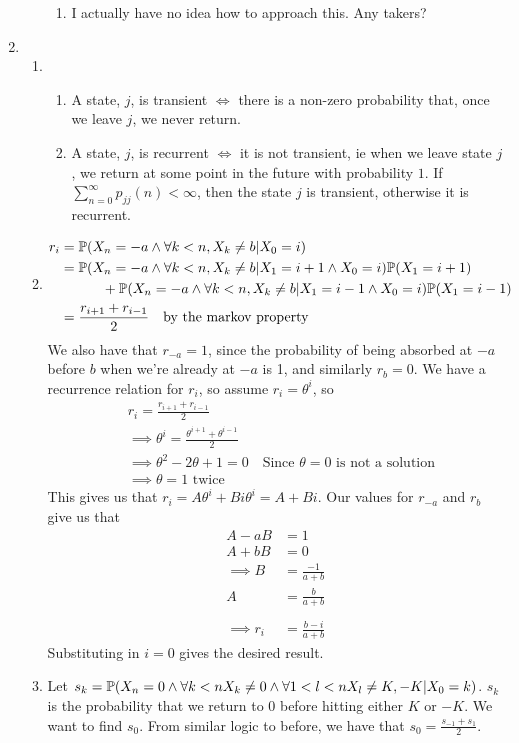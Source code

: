 \documentclass{article}
\begin{document}
\begin{enumerate}
\begin{enumerate}
\begin{enumerate}
\item
I actually have no idea how to approach this. Any takers?
\end{enumerate}
\end{enumerate}
\clearpage
\item 
\begin{enumerate}
\item
\begin{enumerate}
\item
A state, $j$, is transient $\iff$ there is a non-zero probability that, once we leave $j$, we never return.
\item
A state, $j$, is recurrent $\iff$ it is not transient, ie when we leave state $j$, we return at some point in the future with probability $1$. If $\sum\limits_{n=0}^\infty p_{jj}(n) < \infty$, then the state $j$ is transient, otherwise it is recurrent.
\end{enumerate}
\item
\begin{align*}
r_i &= \mathbb{P} (X_n = -a \wedge \forall k<n, X_k \neq b | X_0 = i)\\
&= \mathbb{P} (X_n = -a \wedge \forall k<n, X_k \neq b | X_1 = i+1 \wedge X_0 = i)\mathbb{P} (X_1 = i+1) \\
& \quad \quad \quad + \mathbb{P}(X_n = -a \wedge \forall k<n, X_k \neq b | X_1 = i-1 \wedge X_0 = i)\mathbb{P} (X_1 = i-1)\\
&= \frac{r_{i+1} + r_{i-1}}{2} \quad \mbox{by the markov property}
\end{align*}
We also have that $r_{-a} = 1$, since the probability of being absorbed at $-a$ before $b$ when we're already at $-a$ is 1, and similarly $r_b=0$. We have a recurrence relation for $r_i$, so assume $r_i = \theta^i$, so
\begin{align*}
& r_i = \frac{r_{i+1} + r_{i-1}}{2}\\
&\implies \theta^i = \frac{\theta^{i+1} + \theta^{i-1}}{2}\\
&\implies \theta^2-2\theta+1=0 \quad \mbox{Since $\theta = 0$ is not a solution}\\
&\implies \theta = 1 \mbox { twice}
\end{align*}
This gives us that $r_i = A\theta^i +Bi\theta^i = A+Bi$. Our values for $r_{-a}$ and $r_b$ give us that
\begin{align*}
A-aB &= 1\\
A+bB &= 0\\
\implies B &= \frac{-1}{a+b}\\
A&= \frac{b}{a+b}\\
\\
\implies r_i &= \frac{b-i}{a+b}
\end{align*}
Substituting in $i=0$ gives the desired result.
\item
Let $s_k = \mathbb{P} (X_n = 0 \wedge \forall k<n X_k \neq 0 \wedge \forall 1<l<n X_l \neq K, -K | X_0 = k)$. $s_k$ is the probability that we return to 0 before hitting either $K$ or $-K$. We want to find $s_0$. From similar logic to before, we have that $s_0 = \frac{s_{-1}+s_1}{2}$.


\end{enumerate}
\end{enumerate}
\end{document}
